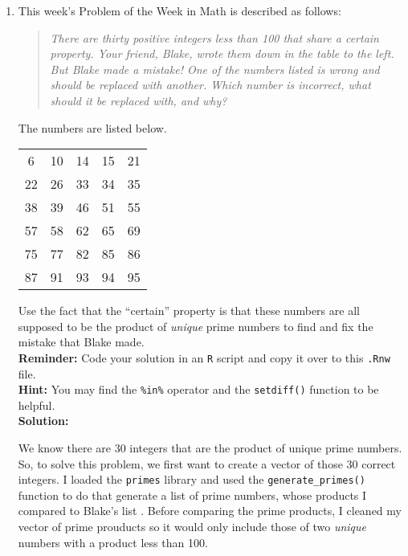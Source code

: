 \documentclass{article}\usepackage[]{graphicx}\usepackage[]{xcolor}
\begin{document}
\begin{enumerate}
\item This week's Problem of the Week in Math is described as follows:
\begin{quotation}
  \textit{There are thirty positive integers less than 100 that share a certain 
  property. Your friend, Blake, wrote them down in the table to the left. But 
  Blake made a mistake! One of the numbers listed is wrong and should be replaced 
  with another. Which number is incorrect, what should it be replaced with, and 
  why?}
\end{quotation}
The numbers are listed below.
\begin{center}
  \begin{tabular}{ccccc}
    6 & 10 & 14 & 15 & 21\\
    22 & 26 & 33 & 34 & 35\\
    38 & 39 & 46 & 51 & 55\\
    57 & 58 & 62 & 65 & 69\\
    75 & 77 & 82 & 85 & 86\\
    87 & 91 & 93 & 94 & 95
  \end{tabular}
\end{center}
Use the fact that the ``certain'' property is that these numbers are all supposed
to be the product of \emph{unique} prime numbers to find and fix the mistake that
Blake made.\\
\textbf{Reminder:} Code your solution in an \texttt{R} script and copy it over
to this \texttt{.Rnw} file.\\
\textbf{Hint:} You may find the \verb|%in%| operator and the \verb|setdiff()| function to be helpful.\\

\textbf{Solution:} 


We know there are 30 integers that are the product of unique prime numbers. So, to solve this problem, we first want to create a vector of those 30 correct integers. I loaded the \texttt{primes} library and used the \texttt{generate\_primes()} function to do that generate a list of prime numbers, whose products I compared to Blake's list \citep{primes}. Before comparing the prime products, I cleaned my vector of prime prouducts so it would only include those of two \emph{unique} numbers with a product less than 100. 


\end{enumerate}
\end{document}
